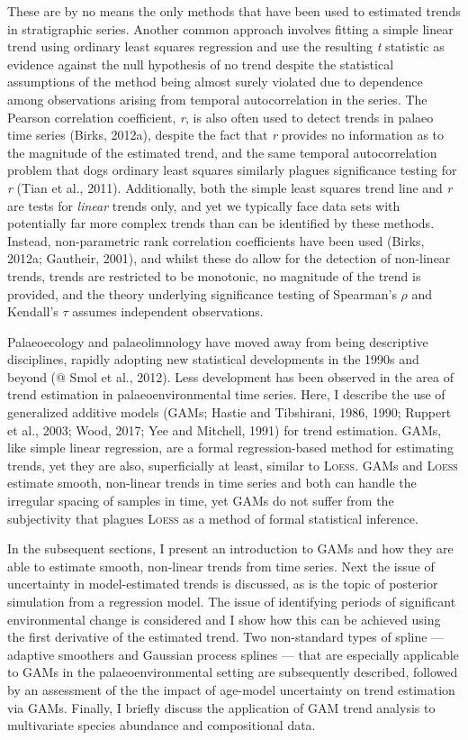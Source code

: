 \documentclass[12pt,]{article}
\newcommand{\loess}{\textsc{Loess}}
\begin{document}
These are by no means the only methods that have been used to estimated
trends in stratigraphic series. Another common approach involves fitting
a simple linear trend using ordinary least squares regression and use
the resulting \emph{t} statistic as evidence against the null hypothesis
of no trend despite the statistical assumptions of the method being
almost surely violated due to dependence among observations arising from
temporal autocorrelation in the series. The Pearson correlation
coefficient, \emph{r}, is also often used to detect trends in palaeo
time series (Birks, 2012a), despite the fact that \emph{r} provides no
information as to the magnitude of the estimated trend, and the same
temporal autocorrelation problem that dogs ordinary least squares
similarly plagues significance testing for \emph{r} (Tian et al., 2011).
Additionally, both the simple least squares trend line and \emph{r} are
tests for \emph{linear} trends only, and yet we typically face data sets
with potentially far more complex trends than can be identified by these
methods. Instead, non-parametric rank correlation coefficients have been
used (Birks, 2012a; Gautheir, 2001), and whilst these do allow for the
detection of non-linear trends, trends are restricted to be monotonic,
no magnitude of the trend is provided, and the theory underlying
significance testing of Spearman's \(\rho\) and Kendall's \(\tau\)
assumes independent observations.

Palaeoecology and palaeolimnology have moved away from being descriptive
disciplines, rapidly adopting new statistical developments in the 1990s
and beyond (@ Smol et al., 2012). Less development has been observed in
the area of trend estimation in palaeoenvironmental time series. Here, I
describe the use of generalized additive models (GAMs; Hastie and
Tibshirani, 1986, 1990; Ruppert et al., 2003; Wood, 2017; Yee and
Mitchell, 1991) for trend estimation. GAMs, like simple linear
regression, are a formal regression-based method for estimating trends,
yet they are also, superficially at least, similar to \loess{}. GAMs and
\loess{} estimate smooth, non-linear trends in time series and both can
handle the irregular spacing of samples in time, yet GAMs do not suffer
from the subjectivity that plagues \loess{} as a method of formal
statistical inference.

In the subsequent sections, I present an introduction to GAMs and how
they are able to estimate smooth, non-linear trends from time series.
Next the issue of uncertainty in model-estimated trends is discussed, as
is the topic of posterior simulation from a regression model. The issue
of identifying periods of significant environmental change is considered
and I show how this can be achieved using the first derivative of the
estimated trend. Two non-standard types of spline --- adaptive smoothers
and Gaussian process splines --- that are especially applicable to GAMs
in the palaeoenvironmental setting are subsequently described, followed
by an assessment of the the impact of age-model uncertainty on trend
estimation via GAMs. Finally, I briefly discuss the application of GAM
trend analysis to multivariate species abundance and compositional data.
\end{document}
